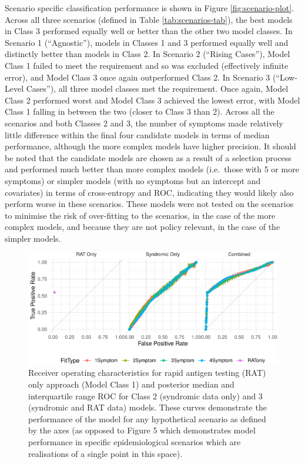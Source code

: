 \documentclass[]{elsarticle} %
\begin{document}
Scenario specific classification performance is shown in Figure \ref{fig:scenario-plot}.
Across all three scenarios (defined in Table \ref{tab:scenarios-tab}), the best models in Class 3 performed equally well or better than the other two model classes.
In Scenario 1 (``Agnostic''), models in Classes 1 and 3 performed equally well and distinctly better than models in Class 2.
In Scenario 2 (``Rising Cases''), Model Class 1 failed to meet the requirement and so was excluded (effectively infinite error), and Model Class 3 once again outperformed Class 2.
In Scenario 3 (``Low-Level Cases''), all three model classes met the requirement.
Once again, Model Class 2 performed worst and Model Class 3 achieved the lowest error, with Model Class 1 falling in between the two (closer to Class 3 than 2).
Across all the scenarios and both Classes 2 and 3, the number of symptoms made relatively little difference within the final four candidate models in terms of median performance, although the more complex models have higher precision.
It should be noted that the candidate models are chosen as a result of a selection process and performed much better than more complex models (i.e.~those with 5 or more symptoms) or simpler models (with no symptoms but an intercept and covariates) in terms of cross-entropy and ROC, indicating they would likely also perform worse in these scenarios.
These models were not tested on the scenarios to minimise the risk of over-fitting to the scenarios, in the case of the more complex models, and because they are not policy relevant, in the case of the simpler models.

\begin{figure}
\centering
\includegraphics{0501_MainText_files/figure-latex/ROC-plot-1.pdf}
\caption{\label{fig:ROC-plot}Receiver operating characteristics for rapid antigen testing (RAT) only approach (Model Class 1) and posterior median and interquartile range ROC for Class 2 (syndromic data only) and 3 (syndromic and RAT data) models. These curves demonstrate the performance of the model for any hypothetical scenario as defined by the axes (as opposed to Figure 5 which demonstrates model performance in specific epidemiological scenarios which are realisations of a single point in this space).}
\end{figure}
\end{document}
